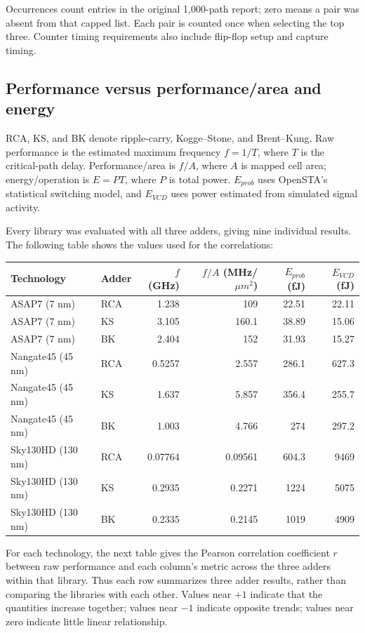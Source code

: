 \documentclass[10pt,letterpaper]{article}
\begin{document}
Occurrences count entries in the original 1,000-path
report; zero means a pair was absent from that capped list. Each pair is
counted once when selecting the top three. Counter timing requirements also
include flip-flop setup and capture timing.

\subsection{Performance versus performance/area and energy}
RCA, KS, and BK denote ripple-carry, Kogge--Stone, and Brent--Kung.
Raw performance is the estimated maximum frequency $f=1/T$, where $T$ is
the critical-path delay. Performance/area is $f/A$, where $A$ is mapped
cell area; energy/operation is $E=PT$, where $P$ is total power.
$E_{prob}$ uses OpenSTA's statistical switching model, and $E_{VCD}$ uses
power estimated from simulated signal activity.

Every library was evaluated with all three adders, giving nine individual
results. The following table shows the values used for the correlations:


\begin{center}\small
\begin{tabular}{llrrrr}
\toprule
Technology & Adder & $f$ (GHz) & $f/A$ (MHz/$\mu m^2$) & $E_{prob}$ (fJ) & $E_{VCD}$ (fJ) \\
\midrule
ASAP7 (7 nm) & RCA & 1.238 & 109 & 22.51 & 22.11 \\
ASAP7 (7 nm) & KS & 3.105 & 160.1 & 38.89 & 15.06 \\
ASAP7 (7 nm) & BK & 2.404 & 152 & 31.93 & 15.27 \\
Nangate45 (45 nm) & RCA & 0.5257 & 2.557 & 286.1 & 627.3 \\
Nangate45 (45 nm) & KS & 1.637 & 5.857 & 356.4 & 255.7 \\
Nangate45 (45 nm) & BK & 1.003 & 4.766 & 274 & 297.2 \\
Sky130HD (130 nm) & RCA & 0.07764 & 0.09561 & 604.3 & 9469 \\
Sky130HD (130 nm) & KS & 0.2935 & 0.2271 & 1224 & 5075 \\
Sky130HD (130 nm) & BK & 0.2335 & 0.2145 & 1019 & 4909 \\
\bottomrule
\end{tabular}
\end{center}


For each technology, the next table gives the Pearson correlation coefficient
$r$ between raw performance and each column's metric across the three
adders within that library. Thus each row summarizes three adder results,
rather than comparing the libraries with each other. Values near $+1$
indicate that the quantities increase together; values near $-1$ indicate
opposite trends; values near zero indicate little linear relationship.
\end{document}
